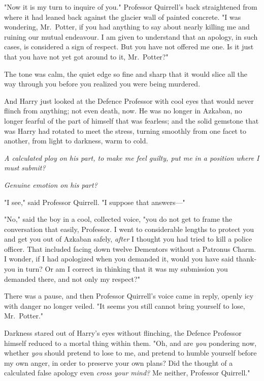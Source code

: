 "Now it is my turn to inquire of you." Professor Quirrell's back straightened
from where it had leaned back against the glacier wall of painted concrete. "I
was wondering, Mr.~Potter, if you had anything to say about nearly killing me
and ruining our mutual endeavour. I am given to understand that an apology, in
such cases, is considered a sign of respect. But you have not offered me one.
Is it just that you have not yet got around to it, Mr.~Potter?"

The tone was calm, the quiet edge so fine and sharp that it would slice all the
way through you before you realized you were being murdered.

And Harry just looked at the Defence Professor with cool eyes that would never
flinch from anything; not even death, now. He was no longer in Azkaban, no
longer fearful of the part of himself that was fearless; and the solid gemstone
that was Harry had rotated to meet the stress, turning smoothly from one facet
to another, from light to darkness, warm to cold.

\emph{A calculated ploy on his part, to make me feel guilty, put me in a
position where I must submit?}

\emph{Genuine emotion on his part?}

"I see," said Professor Quirrell. "I suppose that answers---"

"No," said the boy in a cool, collected voice, "you do not get to frame the
conversation that easily, Professor. I went to considerable lengths to protect
you and get you out of Azkaban safely, \emph{after} I thought you had tried to
kill a police officer. That included facing down twelve Dementors without a
Patronus Charm. I wonder, if I had apologized when you demanded it, would you
have said thank-you in turn? Or am I correct in thinking that it was my
submission you demanded there, and not only my respect?"

There was a pause, and then Professor Quirrell's voice came in reply, openly
icy with danger no longer veiled. "It seems you still cannot bring yourself to
lose, Mr.~Potter."

Darkness stared out of Harry's eyes without flinching, the Defence Professor
himself reduced to a mortal thing within them. "Oh, and are \emph{you}
pondering now, whether \emph{you} should pretend to lose to me, and pretend to
humble yourself before my own anger, in order to preserve your own plans? Did
the thought of a calculated false apology even \emph{cross your mind?} Me
neither, Professor Quirrell."

